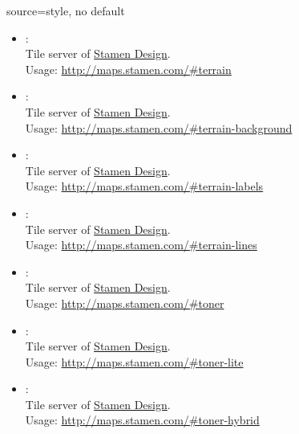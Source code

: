 \begin{docMrcKey}[supply]{source}{=}{style, no default}
\begin{itemize}
\clearpage
  \item{}:\\
    Tile server of \href{http://stamen.com}{Stamen Design}.\\
    Usage: \url{http://maps.stamen.com/#terrain}

  \item{}:\\
    Tile server of \href{http://stamen.com}{Stamen Design}.\\
    Usage: \url{http://maps.stamen.com/#terrain-background}

  \item{}:\\
    Tile server of \href{http://stamen.com}{Stamen Design}.\\
    Usage: \url{http://maps.stamen.com/#terrain-labels}

\clearpage
  \item{}:\\
    Tile server of \href{http://stamen.com}{Stamen Design}.\\
    Usage: \url{http://maps.stamen.com/#terrain-lines}

  \item{}:\\
    Tile server of \href{http://stamen.com}{Stamen Design}.\\
    Usage: \url{http://maps.stamen.com/#toner}

  \item{}:\\
    Tile server of \href{http://stamen.com}{Stamen Design}.\\
    Usage: \url{http://maps.stamen.com/#toner-lite}

\clearpage
  \item{}:\\
    Tile server of \href{http://stamen.com}{Stamen Design}.\\
    Usage: \url{http://maps.stamen.com/#toner-hybrid}


\end{itemize}
\end{docMrcKey}
